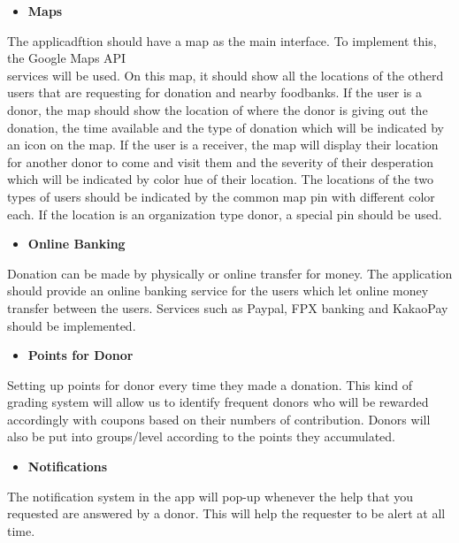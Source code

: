 \documentclass[conference]{IEEEtran}
\begin{document}
\begin{itemize}
\item \textbf{Maps}
\end{itemize}
\par The applicadftion should have a map as the main interface. To implement this, the Google Maps API \\services will be used. On this map, it should show all the locations of the otherd users that are requesting for donation and nearby foodbanks. If the user is a donor, the map should show the location of where the donor is giving out the donation, the time available and the type of donation which will be indicated by an icon on the map. If the user is a receiver, the map will display their location for another donor to come and visit them and the severity of their desperation which will be indicated by color hue of their location. The locations of the two types of users should be indicated by the common map pin with different color each. If the location is an organization type donor, a special pin should be used.\\
\begin{itemize}
\item \textbf{Online Banking}
\end{itemize}
\par Donation can be made by physically or online transfer for money. The application should provide an online banking service for the users which let online money transfer between the users. Services such as Paypal, FPX banking and KakaoPay should be implemented.\\
\begin{itemize}
\item \textbf{Points for Donor}
\end{itemize}
\par Setting up points for donor every time they made a donation. This kind of grading system will allow us to identify frequent donors who will be rewarded accordingly with coupons based on their numbers of contribution. Donors will also be put into groups/level according to the points they accumulated.\\
\begin{itemize}
\item \textbf{Notifications}
\end{itemize}
\par The notification system in the app will pop-up whenever the help that you requested are answered by a donor. This will help the requester to be alert at all time.\\
\end{document}
